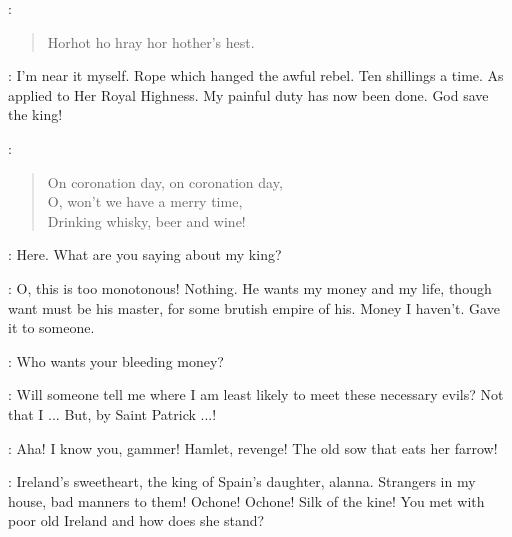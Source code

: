 
\CroppyBoy:
\begin{verse}
    Horhot ho hray hor hother's hest.
\end{verse}



\Rumbold:
I'm near it myself.
Rope which hanged the awful rebel.
Ten shillings a time.
As applied to Her Royal Highness.
My painful duty has now been done.
God save the king!

\EdwardSeventh:
\begin{verse}
    On coronation day, on coronation day,\\
    O, won't we have a merry time,\\
    Drinking whisky, beer and wine!
\end{verse}

\Carr:
Here. What are you saying about my king?

\Stephen:
O, this is too monotonous!
Nothing.
He wants my money and my life, though want must be his master,
for some brutish empire of his.
Money I haven't.
Gave it to someone.

\Carr:
Who wants your bleeding money?

\Stephen:
Will someone tell me where I am least likely to meet these necessary evils?
Not that I ...
But, by Saint Patrick ...!


\Stephen:
Aha!
I know you, gammer!
Hamlet, revenge!
The old sow that eats her farrow!

\GummyGranny:
Ireland's sweetheart, the king of Spain's daughter, alanna.
Strangers in my house, bad manners to them!
Ochone!
Ochone!
Silk of the kine!
You met with poor old Ireland and how does she stand?

